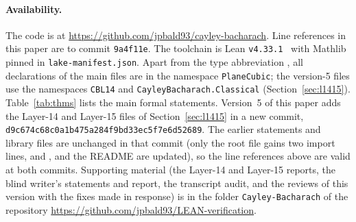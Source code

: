 \documentclass[11pt]{article}
\theoremstyle{definition}
\theoremstyle{remark}
\newcommand{\lean}[1]{\texttt{#1}}
\newcommand{\repo}{https://github.com/jpbald93/cayley-bacharach}
\newcommand{\shortcommit}{9a4f11e}
\begin{document}
\paragraph{Availability.}
The code is at \url{\repo}. Line references in this paper are to commit \texttt{\shortcommit}.
The toolchain is Lean \texttt{v4.33.1}~\cite{Lean4} with Mathlib~\cite{Mathlib} pinned in
\texttt{lake-manifest.json}. Apart from the type abbreviation , all declarations of the main files are in the namespace \lean{PlaneCubic}; the version-5 files use the namespaces \lean{CBL14} and \lean{CayleyBacharach.Classical} (Section~\ref{sec:l1415}).
Table~\ref{tab:thms} lists the main formal statements.
Version~5 of this paper adds the Layer-14 and Layer-15 files of Section~\ref{sec:l1415} in a new
commit, \texttt{d9c674c68c0a1b475a284f9bd33ec5f7e6d52689}. The earlier statements and library files are unchanged in that commit
(only the root file gains two import lines, and ,  and the README are
updated), so the line references above are valid at both commits.
Supporting material (the Layer-14 and Layer-15 reports, the blind writer's statements and report, the transcript audit, and the reviews of this version with the fixes made in response) is in the folder \texttt{Cayley-Bacharach} of the repository \url{https://github.com/jpbald93/LEAN-verification}.
\end{document}
